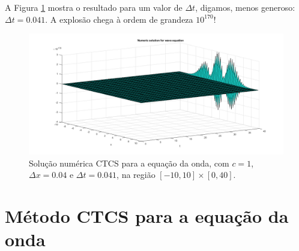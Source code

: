 \documentclass{article}
\begin{document}
\begin{itemize}
            \clearpage

            A Figura \ref{fig:wave_5} mostra o resultado para um valor de
            $\Delta t$, digamos, menos generoso: $\Delta t = 0.041$. A explosão
            chega à ordem de grandeza $10^{170}$!

            \begin{figure}[!h]
                \centerline{
                    \includegraphics[width=1.4\textwidth]{images/wave_5.png}
                }
                \caption{Solução numérica CTCS para a equação da onda, com $c = 1$,
                $\Delta x = 0.04$ e $\Delta t = 0.041$, na região $[-10, 10] \times [0, 40]$.}
                \label{fig:wave_5}
            \end{figure}


    \end{itemize}

    \clearpage

    \appendix

    \section{Método CTCS para a equação da onda}
        \label{appendix:ctcs}
\end{document}
